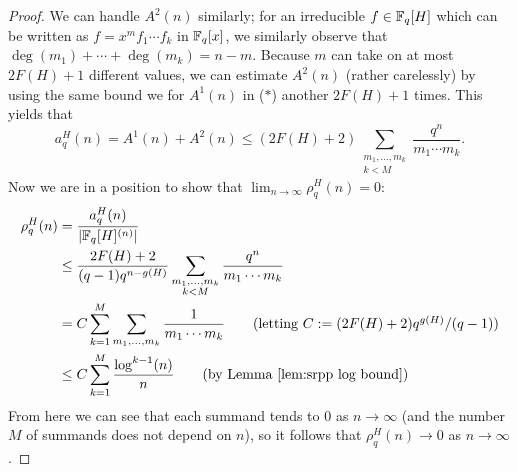 \begin{proof}
We can handle $A^2(n)$ similarly; for an irreducible $f\in \mathbb{F}_q[H]$ which can be written as $f= x^m f_1\cdots f_k$ in $\mathbb{F}_q[x]$, we similarly observe that $\deg(m_1)+\cdots+\deg(m_k) = n-m$. 
Because $m$ can take on at most $2F(H)+1$ different values, we can estimate $A^2(n)$ (rather carelessly) by using the same bound we for $A^1(n)$ in ($*$) another $2F(H)+1$ times.
This yields that
\[a_q^H(n) = A^1(n) + A^2(n) \le (2F(H)+2) \sum_{\substack{m_1,\dots,m_k \\ k < M}} \frac{q^n}{m_1\cdots m_k}. \]
Now we are in a position to show that $\lim_{n\to\infty}\rho_q^H(n) = 0$:
\begin{align*}
\rho_q^H(n) 
&= \frac{a_q^H(n)}{|\Fq[H]^{(n)}|} \\
&\le \frac{2F(H)+2}{(q-1)q^{n-g(H)}} \sum_{\substack{m_1,\dots,m_k \\ k<M}} \frac{q^n}{m_1\cdots m_k} \\
&=C \sum_{k=1}^M \sum_{m_1,\dots,m_k} \frac{1}{m_1\cdots m_k} \tag{letting $C := (2F(H)+2)q^{g(H)}/(q-1)$}\\
&\le C \sum_{k=1}^M \frac{\log^{k-1}(n)}{n} \tag{by Lemma \ref{lem:srpp log bound}} \\
\end{align*}
From here we can see that each summand tends to $0$ as $n\to\infty$ (and the number $M$ of summands does not depend on $n$), so it follows that $\rho_q^H(n) \to 0$ as $n\to \infty$.
\end{proof}